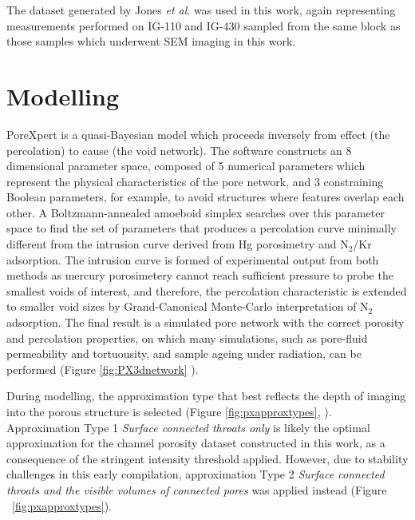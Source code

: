 \documentclass[review]{elsarticle}
\begin{document}
The dataset generated by Jones \textit{et al}. \citep{Jones2018} was used in
this work, again representing measurements performed on IG-110 and IG-430
sampled from the same block as those samples which underwent SEM imaging in this
work.

\section{Modelling}

PoreXpert is a quasi-Bayesian model which proceeds inversely from effect (the
percolation) to cause (the void network). The software constructs an 8
dimensional parameter space,  composed of 5 numerical parameters which represent
the physical characteristics of the pore network, and 3 constraining Boolean
parameters, for example, to avoid structures where features overlap each other.
A Boltzmann-annealed amoeboid simplex searches over this parameter space to find
the set of parameters that produces a percolation curve minimally different from
the intrusion curve derived from Hg porosimetry and N$_2$/Kr adsorption. The
intrusion curve is formed of experimental output from both methods as mercury
porosimetery cannot reach sufficient pressure to probe the smallest
voids of interest, and therefore, the percolation characteristic is extended to
smaller void sizes by Grand-Canonical Monte-Carlo interpretation of N$_2$
adsorption.  The final result is a simulated pore network with the correct
porosity and percolation properties, on which many simulations, such as
pore-fluid permeability and tortuousity, and sample ageing under radiation, can
be performed (Figure \ref{fig:PX3dnetwork} \citep{MatthewsPoreXpert2025}).


    During modelling, the approximation type that best reflects the depth of
    imaging into the porous structure is selected (Figure
    \ref{fig:pxapproxtypes}, \citep{MatthewsPoreXpert2025}). Approximation Type
    1 \textit{Surface connected throats only} is likely the optimal
    approximation for the channel porosity dataset constructed in this work, as
    a consequence of the stringent intensity threshold applied. However, due to
    stability challenges in this early compilation, approximation Type 2
    \textit{Surface connected throats and the visible volumes of connected
    pores} was applied instead (Figure ~\ref{fig:pxapproxtypes}). 
\end{document}
